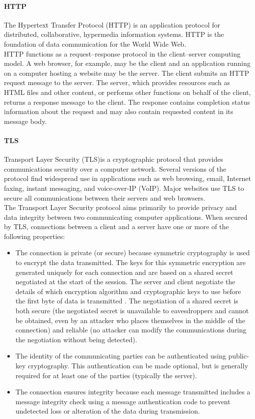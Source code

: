 \paragraph{HTTP} 
The Hypertext Transfer Protocol (HTTP) is an application protocol for distributed, collaborative, hypermedia information systems. HTTP is the foundation of data communication for the World Wide Web.
\\
HTTP functions as a request–response protocol in the client–server computing model. A web browser, for example, may be the client and an application running on a computer hosting a website may be the server. The client submits an HTTP request message to the server. The server, which provides resources such as HTML files and other content, or performs other functions on behalf of the client, returns a response message to the client. The response contains completion status information about the request and may also contain requested content in its message body.

\paragraph{TLS} 
Transport Layer Security (TLS)is a cryptographic protocol that provides communications security over a computer network. Several versions of the protocol find widespread use in applications such as web browsing, email, Internet faxing, instant messaging, and voice-over-IP (VoIP). Major websites use TLS to secure all communications between their servers and web browsers.
\\
The Transport Layer Security protocol aims primarily to provide privacy and data integrity between two communicating computer applications. When secured by TLS, connections between a client  and a server have one or more of the following properties:
\begin{itemize}
\item The connection is private (or secure) because symmetric cryptography is used to encrypt the data transmitted. The keys for this symmetric encryption are generated uniquely for each connection and are based on a shared secret negotiated at the start of the session. The server and client negotiate the details of which encryption algorithm and cryptographic keys to use before the first byte of data is transmitted . The negotiation of a shared secret is both secure (the negotiated secret is unavailable to eavesdroppers and cannot be obtained, even by an attacker who places themselves in the middle of the connection) and reliable (no attacker can modify the communications during the negotiation without being detected).
\item The identity of the communicating parties can be authenticated using public-key cryptography. This authentication can be made optional, but is generally required for at least one of the parties (typically the server).
\item The connection ensures integrity because each message transmitted includes a message integrity check using a message authentication code to prevent undetected loss or alteration of the data during transmission.
\end{itemize}


